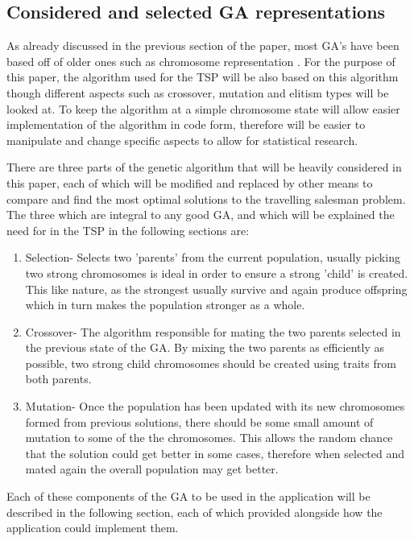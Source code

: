 \documentclass[article]{IEEEtran}
\begin{document}
\subsection{Considered and selected GA representations}
As already discussed in the previous section of the paper, most GA's have been based off of older ones such as chromosome representation \cite{5}. For the purpose of this paper, the algorithm used for the TSP will be also based on this algorithm though different aspects such as crossover, mutation and elitism types will be looked at. To keep the algorithm at a simple chromosome state will allow easier implementation of the algorithm in code form, therefore will be easier to manipulate and change specific aspects to allow for statistical research. \par
There are three parts of the genetic algorithm that will be heavily considered in this paper, each of which will be modified and replaced by other means to compare and find the most optimal solutions to the travelling salesman problem. The three which are integral to any good GA, and which will be explained the need for in the TSP in the following sections are:
\begin{enumerate}
\item Selection- Selects two 'parents' from the current population, usually picking two strong chromosomes is ideal in order to ensure a strong 'child' is created. This like nature, as the strongest usually survive and again produce offspring which in turn makes the population stronger as a whole.
\item Crossover- The algorithm responsible for mating the two parents selected in the previous state of the GA. By mixing the two parents as efficiently as possible, two strong child chromosomes should be created using traits from both parents. 
\item Mutation- Once the population has been updated with its new chromosomes formed from previous solutions, there should be some small amount of mutation to some of the the chromosomes. This allows the random chance that the solution could get better in some cases, therefore when selected and mated again the overall population may get better.
\end{enumerate}
Each of these components of the GA to be used in the application will be described in the following section, each of which provided alongside how the application could implement them.
\end{document}
